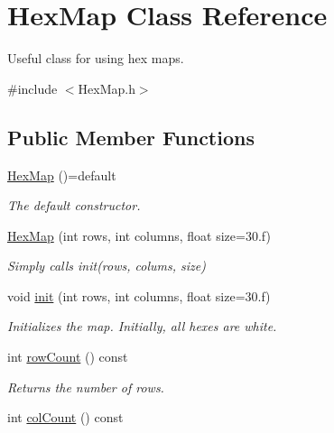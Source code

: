 \hypertarget{classHexMap}{}\section{Hex\+Map Class Reference}
\label{classHexMap}


Useful class for using hex maps.  




{\ttfamily \#include $<$Hex\+Map.\+h$>$}

\subsection*{Public Member Functions}
\begin{DoxyCompactItemize}
\item 
\hyperlink{classHexMap_a978943df7d0597662f77e116b47592e2}{Hex\+Map} ()=default\hypertarget{classHexMap_a978943df7d0597662f77e116b47592e2}{}\label{classHexMap_a978943df7d0597662f77e116b47592e2}

\begin{DoxyCompactList}\small\item\em The default constructor. \end{DoxyCompactList}\item 
\hyperlink{classHexMap_a5c7c0b881e9f6671d6460604979a6809}{Hex\+Map} (int rows, int columns, float size=30.f)
\begin{DoxyCompactList}\small\item\em Simply calls init(rows, colums, size) \end{DoxyCompactList}\item 
void \hyperlink{classHexMap_aab6bd6a4e324a2cc3e22f4e1c5143d4c}{init} (int rows, int columns, float size=30.f)
\begin{DoxyCompactList}\small\item\em Initializes the map. Initially, all hexes are white. \end{DoxyCompactList}\item 
int \hyperlink{classHexMap_a5002c49a38866cba5dee83a18310948d}{row\+Count} () const \hypertarget{classHexMap_a5002c49a38866cba5dee83a18310948d}{}\label{classHexMap_a5002c49a38866cba5dee83a18310948d}

\begin{DoxyCompactList}\small\item\em Returns the number of rows. \end{DoxyCompactList}\item 
int \hyperlink{classHexMap_a1b66281a5f11995aa2e02b06cd758372}{col\+Count} () const \hypertarget{classHexMap_a1b66281a5f11995aa2e02b06cd758372}{}\label{classHexMap_a1b66281a5f11995aa2e02b06cd758372}


\end{DoxyCompactItemize}
